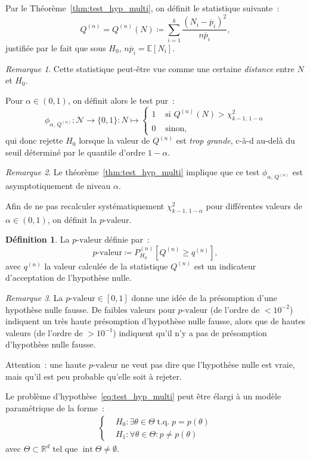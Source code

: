 \documentclass{report}
\DeclareMathOperator{\tq}{\text{ t.q. }}
\DeclareMathOperator{\intr}{int}  %
\newcommand{\E}{\mathbb E}
\newcommand{\R}{\mathbb R}
\newcommand{\n}{{(n)}}
\newcommand{\pval}{p\text{-valeur}}
\theoremstyle{definition}
\newtheorem{déf}[thm]{Définition}
\theoremstyle{remark}
\newtheorem*{rmq}{Remarque}
\begin{document}
			Par le Théorème~\ref{thm:test_hyp_multi}, on définit le statistique suivante~:
			\[Q^\n = Q^\n(N) \coloneqq \sum_{i=1}^k\frac {(N_i - \overline p_i)^2}{n\overline p_i},\]
			justifiée par le fait que sous $H_0$, $n\overline p_i = \E[N_i]$.

			\begin{rmq} Cette statistique peut-être vue comme une certaine \textit{distance} entre $N$ et $H_0$.
			\end{rmq}

			Pour $\alpha \in (0, 1)$, on définit alors le test pur~:
			\[\phi_{\alpha,\,Q^\n} : \mathcal N \to \{0, 1\} : N \mapsto
			\begin{cases}
				1 &\text{ si } Q^\n(N) > \chi^2_{k-1,\,1-\alpha} \\
				0 &\text{ sinon},
			\end{cases}\]
			qui donc rejette $H_0$ lorsque la valeur de $Q^\n$ est \textit{trop grande}, c-à-d au-delà du seuil déterminé par le quantile d'ordre $1-\alpha$.

			\begin{rmq} Le théorème~\ref{thm:test_hyp_multi} implique que ce test $\phi_{\alpha,\,Q^\n}$ est asymptotiquement de niveau $\alpha$.
			\end{rmq}

			Afin de ne pas recalculer systématiquement $\chi^2_{k-1,\,1-\alpha}$ pour différentes valeurs de $\alpha \in (0, 1)$, on définit la $\pval$.

			\begin{déf} La $\pval$ définie par~:
			\[\pval \coloneqq P_{H_0}^\n[Q^\n \geq q^\n],\]
			avec $q^\n$ la valeur calculée de la statistique $Q^\n$ est un indicateur d'acceptation de l'hypothèse nulle.
			\end{déf}

			\begin{rmq} La $\pval \in [0, 1]$ donne une idée de la présomption d'une hypothèse nulle fausse. De faibles valeurs pour $\pval$ (de l'ordre de
			$< 10^{-2}$) indiquent un très haute présomption d'hypothèse nulle fausse, alors que de hautes valeurs (de l'ordre de $> 10^{-1}$) indiquent qu'il
			n'y a pas de présomption d'hypothèse nulle fausse.

			Attention~: une haute $\pval$ ne veut pas dire que l'hypothèse nulle est vraie, mais qu'il est peu probable qu'elle soit à rejeter.
			\end{rmq}

			Le problème d'hypothèse~\eqref{eq:test_hyp_multi} peut être élargi à un modèle paramétrique de la forme~:
			\begin{align}\label{eq:test_hyp_multi_param}
				\begin{cases}
					&H_0 : \exists \theta \in \Theta \tq p = p(\theta) \\
					&H_1 : \forall \theta \in \Theta : p \neq p(\theta)
				\end{cases}
			\end{align}
			avec $\Theta \subset \R^d$ tel que $\intr \Theta \neq \emptyset$.
\end{document}
